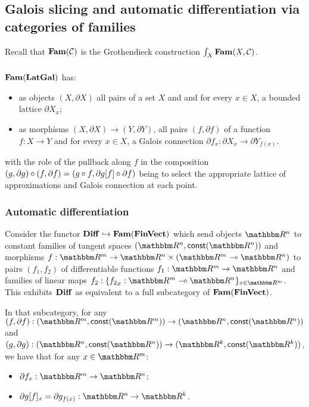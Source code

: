 \subsection{Galois slicing and automatic differentiation via categories of families}
\label{sec:galois-slicing-auto-diff-via-fam}

Recall that $\mathbf{Fam}(\mathcal{C})$ is the Grothendieck construction $\int_{X}\mathbf{Fam}(X, \mathcal{C})$.

\subsubsection{\GPS}
\label{sec:galois-slicing-auto-diff-via-fam:galois-slicing}

$\mathbf{Fam}(\mathbf{LatGal})$ has:
\begin{itemize}
\item as objects $(X, \partial X)$ all pairs of a set $X$ and and for every $x \in X$, a bounded lattice
$\partial X_x$;
\item as morphisms $(X, \partial X) \to (Y, \partial Y)$, all pairs $(f, \partial f)$ of a function $f: X \to
Y$ and for every $x \in X$, a Galois connection $\partial f_x: \partial X_x \to \partial Y_{f(x)}$.
\end{itemize}

\noindent with the role of the pullback along $f$ in the composition $(g, \partial g) \circ (f, \partial f) =
(g \circ f, \partial g[f] \circ \partial f)$ being to select the appropriate lattice of
approximations and Galois connection at each point.

\subsubsection{Automatic differentiation}
\label{sec:galois-slicing-auto-diff-via-fam:auto-diff}

Consider the functor $\mathbf{Diff} \hookrightarrow \mathbf{Fam}(\mathbf{FinVect})$ which send objects $\RR^n$ to constant families of
tangent spaces $(\RR^n, \const(\RR^n))$ and morphisms $f: \RR^m \to \RR^n \times (\RR^m \linearto \RR^n)$ to
pairs $(f_1, f_2)$ of differentiable functions $f_1: \RR^m \to \RR^n$ and families of linear maps $f_2:
\{{f_2}_x: \RR^m \linearto \RR^n\}_{x \in \RR^m}$. This exhibits $\mathbf{Diff}$ as equivalent to a full subcategory
of $\mathbf{Fam}(\mathbf{FinVect})$.

In that subcategory, for any $(f, \partial f): (\RR^m, \const(\RR^m)) \to (\RR^n, \const(\RR^n))$ and $(g,
\partial g): (\RR^n, \const(\RR^n)) \to (\RR^k, \const(\RR^k))$, we have that for any $x \in \RR^m$:
\begin{itemize}
\item $\partial f_x: \RR^m \to \RR^n$;
\item $\reindex{\partial g}{f}_x = \partial g_{f(x)}: \RR^n \to \RR^k$.
\end{itemize}

